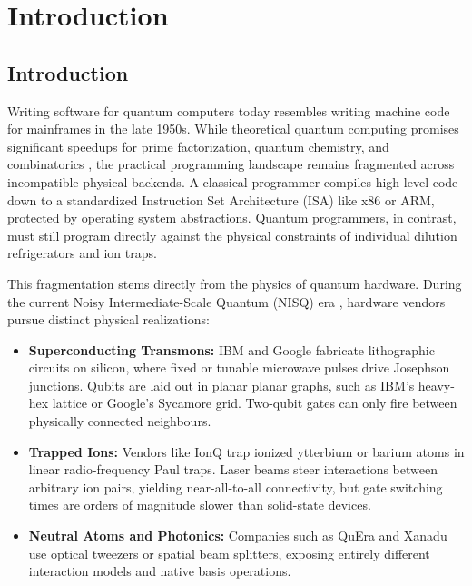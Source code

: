 
\chapter{Introduction}


\section{Introduction}

Writing software for quantum computers today resembles writing machine code for mainframes in the late 1950s. While theoretical quantum computing promises significant speedups for prime factorization, quantum chemistry, and combinatorics \cite{nielsen2010}, the practical programming landscape remains fragmented across incompatible physical backends. A classical programmer compiles high-level code down to a standardized Instruction Set Architecture (ISA) like x86 or ARM, protected by operating system abstractions. Quantum programmers, in contrast, must still program directly against the physical constraints of individual dilution refrigerators and ion traps.

This fragmentation stems directly from the physics of quantum hardware. During the current Noisy Intermediate-Scale Quantum (NISQ) era \cite{preskill2018}, hardware vendors pursue distinct physical realizations:
\begin{itemize}[leftmargin=*]
    \item \textbf{Superconducting Transmons:} IBM and Google fabricate lithographic circuits on silicon, where fixed or tunable microwave pulses drive Josephson junctions. Qubits are laid out in planar planar graphs, such as IBM's heavy-hex lattice or Google's Sycamore grid. Two-qubit gates can only fire between physically connected neighbours.
    \item \textbf{Trapped Ions:} Vendors like IonQ trap ionized ytterbium or barium atoms in linear radio-frequency Paul traps. Laser beams steer interactions between arbitrary ion pairs, yielding near-all-to-all connectivity, but gate switching times are orders of magnitude slower than solid-state devices.
    \item \textbf{Neutral Atoms and Photonics:} Companies such as QuEra and Xanadu use optical tweezers or spatial beam splitters, exposing entirely different interaction models and native basis operations.
\end{itemize}


